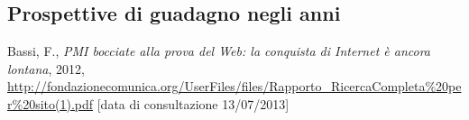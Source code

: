 \subsection{ Prospettive di guadagno negli anni}


\begin{thebibliography}{90}
   Bassi, F., \textit{PMI bocciate alla prova del Web: la conquista di Internet è ancora lontana}, 2012, \url{http://fondazionecomunica.org/UserFiles/files/Rapporto_RicercaCompleta%20per%20sito(1).pdf} [data di consultazione 13/07/2013]
\end{thebibliography}


